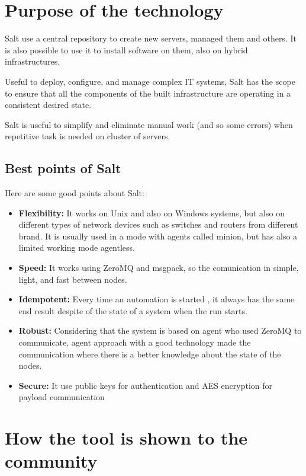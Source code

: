 \documentclass[12pt,a4paper,openright,twoside]{book}
\begin{document}
\section{Purpose of the technology}
Salt use a central repository to create new servers, managed them and others. It is also possible to use it to install software on them, also on hybrid infrastructures.


Useful to deploy, configure, and manage complex IT systems, Salt has the scope to ensure that all the components of the built infrastructure are operating in a consistent desired state.


Salt is useful to simplify and eliminate manual work (and so some errors) when repetitive task is needed on cluster of servers.

\subsection{Best points of Salt}

Here are some good points about Salt:
\begin{itemize}
    \item \textbf{Flexibility:} It works on Unix and also on Windows systems, but also on different types of network devices such as switches and routers from different brand.
                                It is usually used in a mode with agents called minion, but has also a limited working mode agentless.
    \item \textbf{Speed:} It works using ZeroMQ and msgpack, so the comunication in simple, light, and fast between nodes.
    \item \textbf{Idempotent:} Every time an automation is started , it always has the same end result despite of the state of a system when the run starts.
    \item \textbf{Robust:} Considering that the system is based on agent who used ZeroMQ to communicate, agent approach with a good technology made the communication where there is a better knowledge about the state of the nodes.
    \item \textbf{Secure:} It use public keys for authentication and AES encryption for payload communication
\end{itemize}

\section{How the tool is shown to the community}
\end{document}
